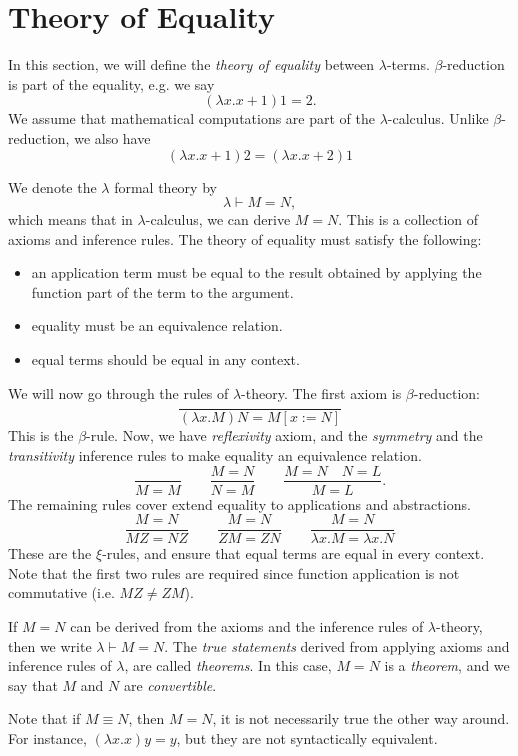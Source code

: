 \documentclass[a4paper, openany]{memoir}
\theoremstyle{definition}
\begin{document}
    \section{Theory of Equality}
    In this section, we will define the \emph{theory of equality} between $\lambda$-terms. $\beta$-reduction is part of the equality, e.g. we say
    \[(\lambda x.x + 1) 1 = 2.\]
    We assume that mathematical computations are part of the $\lambda$-calculus. Unlike $\beta$-reduction, we also have
    \[(\lambda x.x + 1) 2 = (\lambda x.x + 2) 1\]

    We denote the $\lambda$ formal theory by 
    \[\lambda \vdash M = N,\]
    which means that in $\lambda$-calculus, we can derive $M = N$. This is a collection of axioms and inference rules. The theory of equality must satisfy the following:
    \begin{itemize}
        \item an application term must be equal to the result obtained by applying the function part of the term to the argument.
        \item equality must be an equivalence relation.
        \item equal terms should be equal in any context.
    \end{itemize}
    
    We will now go through the rules of $\lambda$-theory. The first axiom is $\beta$-reduction:
    \[\frac{}{(\lambda x.M)N = M[x := N]}\]
    This is the $\beta$-rule. Now, we have \emph{reflexivity} axiom, and the \emph{symmetry} and the \emph{transitivity} inference rules to make equality an equivalence relation.
    \[\frac{}{M = M} \qquad \frac{M = N}{N = M} \qquad \frac{M = N \quad N = L}{M = L}.\]
    The remaining rules cover extend equality to applications and abstractions.
    \[\frac{M = N}{MZ = NZ} \qquad \frac{M = N}{ZM = ZN} \qquad \frac{M = N}{\lambda x.M = \lambda x.N}\]
    \noindent These are the $\xi$-rules, and ensure that equal terms are equal in every context. Note that the first two rules are required since function application is not commutative (i.e. $MZ \neq ZM$).

    If $M = N$ can be derived from the axioms and the inference rules of $\lambda$-theory, then we write $\lambda \vdash M = N$. The \emph{true statements} derived from applying axioms and inference rules of $\lambda$, are called \emph{theorems}. In this case, $M = N$ is a \emph{theorem}, and we say that $M$ and $N$ are \emph{convertible}. 
    
    Note that if $M \equiv N$, then $M = N$, it is not necessarily true the other way around. For instance, $(\lambda x.x) y = y$, but they are not syntactically equivalent.
\end{document}
